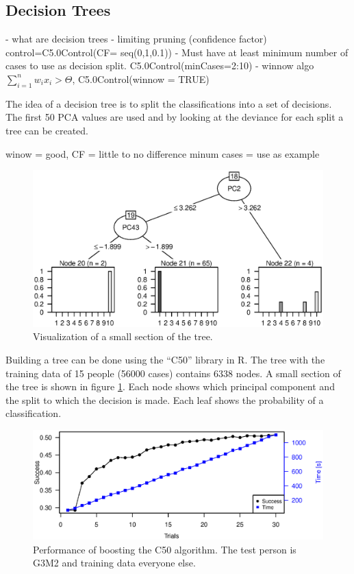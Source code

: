 \subsection{Decision Trees}

- what are decision trees
- limiting pruning (confidence factor) control=C5.0Control(CF= seq(0,1,0.1))
- Must have at least minimum number of cases to use as decision split. C5.0Control(minCases=2:10)
- winnow algo \(\sum_{i=1}^{n} w_i x_i > \Theta\), C5.0Control(winnow = TRUE)

The idea of a decision tree is to split the classifications into a set of decisions.
The first 50 PCA values are used and by looking at the deviance for each split a tree can be created.

winow = good,
CF  = little to no difference
minum cases = use as example


\begin{figure}[h]
\includegraphics[width = \textwidth]{graphics/tree_section}
\caption[Visualization of a tree.]{Visualization of a small section of the tree.}
\label{fig:tree_section}
\end{figure}

Building a tree can be done using the ``C50'' library in R.
The tree with the training data of 15 people (56000 cases) contains 6338 nodes.
A small section of the tree is shown in figure \ref{fig:tree_section}.
Each node shows which principal component and the split to which the decision is made.
Each leaf shows the probability of a classification.

\begin{figure}[H]
\includegraphics[width = \textwidth]{graphics/tree_timing_entropy}
\caption[Performance of boosting the C50 algorithm.]{Performance of boosting the C50 algorithm. The test person is G3M2 and training data everyone else.}
\label{fig:tree_timing}
\end{figure}

